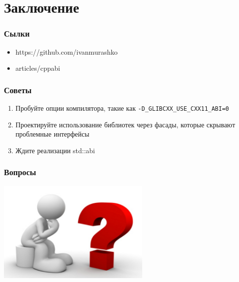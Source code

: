 \documentclass{beamer}
\begin{document}
\section{Заключение}

\begin{frame}[fragile]
\frametitle{Сылки}
\begin{itemize}
\item https://github.com/ivanmurashko
\item articles/cppabi
\end{itemize}
\end{frame}

\begin{frame}[fragile]
\frametitle{Советы}
\begin{enumerate}
\item Пробуйте опции компилятора, такие как
  \texttt{-D\_GLIBCXX\_USE\_CXX11\_ABI=0}
\item Проектируйте использование библиотек через фасады, которые
  скрывают проблемные интерфейсы
\item Ждите реализации std::abi
\end{enumerate}
\end{frame}

\begin{frame}[fragile]
\frametitle{Вопросы}
\begin{center}
\includegraphics[height=5cm]{questions.jpg}
\end{center}
\end{frame}
\end{document}
